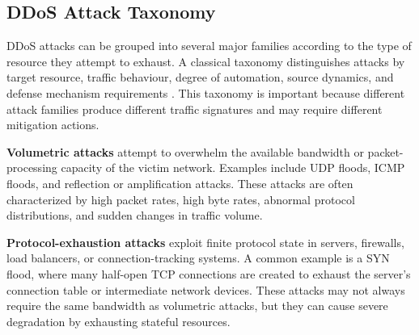\documentclass[12pt, a4paper, reqno, oneside]{book}
\begin{document}

\subsection{DDoS Attack Taxonomy}
\label{subsec:ddos-taxonomy}

DDoS attacks can be grouped into several major families according to the type
of resource they attempt to exhaust. A classical taxonomy distinguishes attacks
by target resource, traffic behaviour, degree of automation, source dynamics,
and defense mechanism requirements \cite{mirkovic2004taxonomy}. This taxonomy
is important because different attack families produce different traffic
signatures and may require different mitigation actions.

\textbf{Volumetric attacks} attempt to overwhelm the available bandwidth or
packet-processing capacity of the victim network. Examples include UDP floods,
ICMP floods, and reflection or amplification attacks. These attacks are often
characterized by high packet rates, high byte rates, abnormal protocol
distributions, and sudden changes in traffic volume.

\textbf{Protocol-exhaustion attacks} exploit finite protocol state in servers,
firewalls, load balancers, or connection-tracking systems. A common example is
a SYN flood, where many half-open TCP connections are created to exhaust the
server's connection table or intermediate network devices. These attacks may
not always require the same bandwidth as volumetric attacks, but they can
cause severe degradation by exhausting stateful resources.
\end{document}
